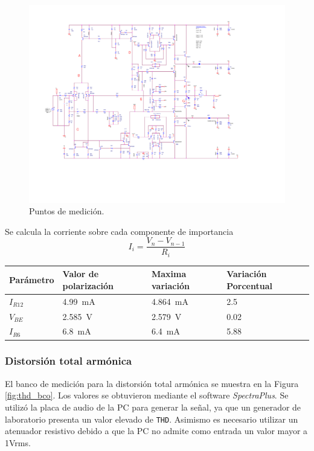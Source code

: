 		\begin{figure}[H]
			\centering
			\includegraphics[scale=0.6]{./Figuras/esquema_puntos.pdf}
			\caption{Puntos de medición.}
			\label{fig:esq_med}
		\end{figure}
			
		Se calcula la corriente sobre cada componente de importancia
		\begin{equation*}
		I_i = \frac{V_n - V_{n-1}}{R_i} 
		\end{equation*}

		\begin{table}
			\centering
		\begin{tabular}{|l|l|l|l|}
		\hline
		Parámetro & Valor de polarización & Maxima variación & Variación Porcentual \\ \hline
		$I_{R12}$      & \SI{4.99}{\mA}       		  & \SI{4.864}{\mA}		&  2.5 \\ \hline
		$V_{BE}$      & \SI{2.585}{\V}      		  & \SI{2.579}{\V}		& 0.02  \\ \hline
		$I_{R6}$      & \SI{6.8}{\mA}      		  & \SI{6.4}{\mA}		& 5.88  \\ \hline
		\end{tabular}
		\end{table}

		
		\subsubsection{Distorsión total armónica}

		El banco de medición para la distorsión total armónica se muestra en la Figura \ref{fig:thd_bco}. Los valores se obtuvieron mediante el software \textit{SpectraPlus}. Se utilizó la placa de audio de la PC para generar la señal, ya que un generador de laboratorio presenta un valor elevado de \texttt{THD}. Asimismo es necesario utilizar un atenuador resistivo debido a que la PC no admite como entrada un valor mayor a 1Vrms. 

